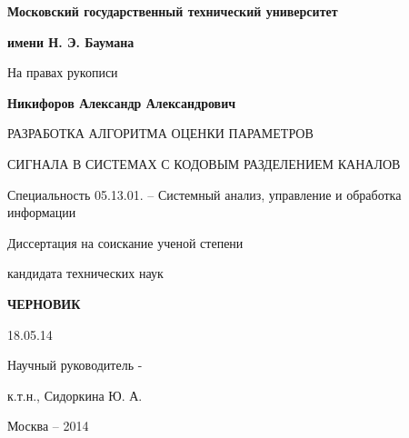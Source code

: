 \noindent\centerline{\bf{Московский государственный технический университет}}
\noindent\centerline{\bf{имени Н. Э. Баумана}}
\vspace{\baselineskip}
\vspace{\baselineskip}

\hfill На правах рукописи

\vspace{\baselineskip}
\vspace{\baselineskip}

\noindent\centerline{\bf{Никифоров Александр Александрович}}

\vspace{\baselineskip}
\vspace{\baselineskip}

\noindent\centerline{РАЗРАБОТКА АЛГОРИТМА ОЦЕНКИ ПАРАМЕТРОВ}
\noindent\centerline{СИГНАЛА В СИСТЕМАХ С КОДОВЫМ РАЗДЕЛЕНИЕМ КАНАЛОВ}

\vspace{\baselineskip}
\vspace{\baselineskip}

\noindent\centerline{Специальность 05.13.01. – Системный анализ, управление и обработка информации}

\vspace{\baselineskip}
\vspace{\baselineskip}

\noindent\centerline{Диссертация на соискание ученой степени}
\noindent\centerline{кандидата технических наук}


\vspace{\baselineskip}
\vspace{\baselineskip}
\noindent\centerline{\bf{ЧЕРНОВИК}}
\noindent\centerline{18.05.14}

\vspace{\baselineskip}
\vspace{\baselineskip}

\hfill{Научный руководитель -}

\hfill{к.т.н., Сидоркина Ю. А.}

\vfill
\noindent\centerline{Москва – 2014}

\newpage

